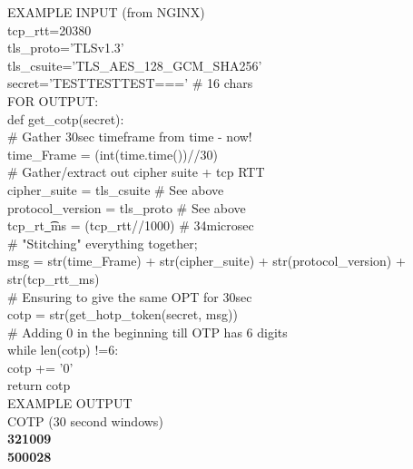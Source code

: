 \documentclass[a4paper, 11pt]{article} 				%
\begin{document}
\noindent
EXAMPLE INPUT (from NGINX)\\
\noindent
tcp\_rtt=20380\\
\noindent
tls\_proto='TLSv1.3'\\
\noindent
tls\_csuite='TLS\_AES\_128\_GCM\_SHA256'\\
\noindent
secret='TESTTESTTEST===' \# 16 chars\\

\noindent
FOR OUTPUT:\\
\noindent
def get\_cotp(secret):\\
\indent \# Gather 30sec timeframe from time - now!\\
\indent time\_Frame = (int(time.time())//30)\\
\indent \# Gather/extract out cipher suite + tcp RTT\\
\indent cipher\_suite = tls\_csuite 		         \# See above\\
\indent protocol\_version = tls\_proto		         \# See above\\
\indent tcp\_rt\t\_ms = (tcp\_rtt//1000)		         \# 34microsec\\     

\# "Stitching" everything together;\\
\indent
msg = str(time\_Frame) + str(cipher\_suite) \indent + str(protocol\_version) + \indent str(tcp\_rtt\_ms)\\

\# Ensuring to give the same OPT for 30sec\\
\indent cotp = str(get\_hotp\_token(secret, msg))\\

\# Adding 0 in the beginning till OTP has 6 digits\\
\indent while len(cotp) !=6:\\
 \indent \indent cotp += '0'\\

\indent \indent return cotp\\

\noindent
EXAMPLE OUTPUT\\
 \noindent
 COTP (30 second windows)\\
 \textbf{321009}\\
 \textbf{500028}\\ 



\end{document}
